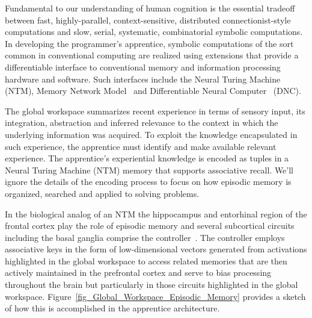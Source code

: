 Fundamental to our understanding of human cognition is the essential tradeoff between fast, highly-parallel, context-sensitive, distributed connectionist-style computations and slow, serial, systematic, combinatorial symbolic computations. In developing the programmer's apprentice, symbolic computations of the sort common in conventional computing are realized using extensions that provide a differentiable interface to conventional memory and information processing hardware and software. Such interfaces include the Neural Turing Machine~\cite{GravesetalCoRR-14} (NTM), Memory Network Model~\cite{WestonetalCoRR-14,SukhbaataretalCoRR-15} and Differentiable Neural Computer~\cite{GravesetalNATURE-16} (DNC).

The global workspace summarizes recent experience in terms of sensory input, its integration, abstraction and inferred relevance to the context in which the underlying information was acquired. To exploit the knowledge encapsulated in such experience, the apprentice must identify and make available relevant experience. The apprentice's experiential knowledge is encoded as tuples in a Neural Turing Machine (NTM) memory that supports associative recall. We'll ignore the details of the encoding process to focus on how episodic memory is organized, searched and applied to solving problems.

In the biological analog of an NTM the hippocampus and entorhinal region of the frontal cortex play the role of episodic memory and several subcortical circuits including the basal ganglia comprise the controller~\cite{OReillyetalLEABRA-16,OReillySCIENCE-06}. The controller employs associative keys in the form of low-dimensional vectors generated from activations highlighted in the global workspace to access related memories that are then actively maintained in the prefrontal cortex and serve to bias processing throughout the brain but particularly in those circuits highlighted in the global workspace. Figure~\ref{fig_Global_Workspace_Episodic_Memory} provides a sketch of how this is accomplished in the apprentice architecture. 


